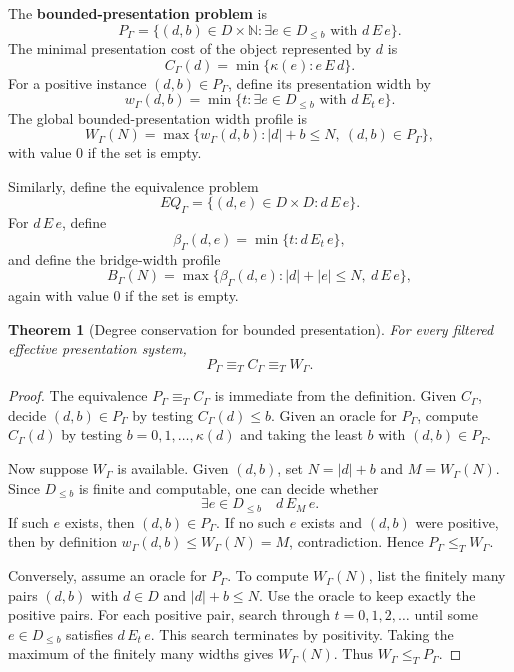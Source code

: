 \documentclass[11pt]{article}
\newtheorem{theorem}{Theorem}[section]
\begin{document}
The \textbf{bounded-presentation problem} is
\[
P_\Gamma=\{(d,b)\in D\times\mathbb N:\exists e\in D_{\leq b}\text{ with }d\,E\,e\}.
\]
The minimal presentation cost of the object represented by \(d\) is
\[
C_\Gamma(d)=\min\{\kappa(e):e\,E\,d\}.
\]
For a positive instance \((d,b)\in P_\Gamma\), define its presentation width by
\[
w_\Gamma(d,b)=\min\{t:\exists e\in D_{\leq b}\text{ with }d\,E_t\,e\}.
\]
The global bounded-presentation width profile is
\[
W_\Gamma(N)=
\max\{w_\Gamma(d,b): |d|+b\leq N,\ (d,b)\in P_\Gamma\},
\]
with value \(0\) if the set is empty.

Similarly, define the equivalence problem
\[
EQ_\Gamma=\{(d,e)\in D\times D:d\,E\,e\}.
\]
For \(d\,E\,e\), define
\[
\beta_\Gamma(d,e)=\min\{t:d\,E_t\,e\},
\]
and define the bridge-width profile
\[
B_\Gamma(N)=
\max\{\beta_\Gamma(d,e): |d|+|e|\leq N,\ d\,E\,e\},
\]
again with value \(0\) if the set is empty.

\begin{theorem}[Degree conservation for bounded presentation]
For every filtered effective presentation system,
\[
P_\Gamma\equiv_T C_\Gamma\equiv_T W_\Gamma.
\]
\end{theorem}

\begin{proof}
The equivalence \(P_\Gamma\equiv_T C_\Gamma\) is immediate from the definition.  Given \(C_\Gamma\), decide \((d,b)\in P_\Gamma\) by testing \(C_\Gamma(d)\leq b\).  Given an oracle for \(P_\Gamma\), compute \(C_\Gamma(d)\) by testing \(b=0,1,\ldots,\kappa(d)\) and taking the least \(b\) with \((d,b)\in P_\Gamma\).

Now suppose \(W_\Gamma\) is available.  Given \((d,b)\), set \(N=|d|+b\) and \(M=W_\Gamma(N)\).  Since \(D_{\leq b}\) is finite and computable, one can decide whether
\[
\exists e\in D_{\leq b}\quad d\,E_M\,e.
\]
If such \(e\) exists, then \((d,b)\in P_\Gamma\).  If no such \(e\) exists and \((d,b)\) were positive, then by definition \(w_\Gamma(d,b)\leq W_\Gamma(N)=M\), contradiction.  Hence \(P_\Gamma\leq_T W_\Gamma\).

Conversely, assume an oracle for \(P_\Gamma\).  To compute \(W_\Gamma(N)\), list the finitely many pairs \((d,b)\) with \(d\in D\) and \(|d|+b\leq N\).  Use the oracle to keep exactly the positive pairs.  For each positive pair, search through \(t=0,1,2,\ldots\) until some \(e\in D_{\leq b}\) satisfies \(d\,E_t\,e\).  This search terminates by positivity.  Taking the maximum of the finitely many widths gives \(W_\Gamma(N)\).  Thus \(W_\Gamma\leq_T P_\Gamma\).
\end{proof}
\end{document}
